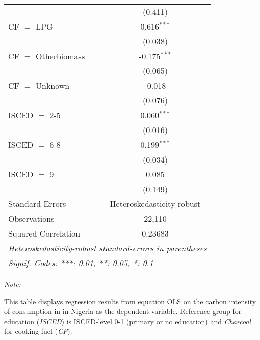\begin{table}[htbp!]
\begin{adjustbox}{width = 1\textwidth, max height = 0.95\textheight, center}
\begin{threeparttable}[b]
\begin{tabular}{lc}
                                & (0.411)\\   
            CF $=$ LPG          & 0.616$^{***}$\\   
                                & (0.038)\\   
            CF $=$ Otherbiomass & -0.175$^{***}$\\   
                                & (0.065)\\   
            CF $=$ Unknown      & -0.018\\   
                                & (0.076)\\   
            ISCED $=$ 2-5       & 0.060$^{***}$\\   
                                & (0.016)\\   
            ISCED $=$ 6-8       & 0.199$^{***}$\\   
                                & (0.034)\\   
            ISCED $=$ 9         & 0.085\\   
                                & (0.149)\\   
            \midrule 
            Standard-Errors     & Heteroskedasticity-robust \\   
            Observations        & 22,110\\  
            Squared Correlation & 0.23683\\  
            \midrule \midrule
            \multicolumn{2}{l}{\emph{Heteroskedasticity-robust standard-errors in parentheses}}\\
            \multicolumn{2}{l}{\emph{Signif. Codes: ***: 0.01, **: 0.05, *: 0.1}}\\
         \end{tabular}
         
         \begin{tablenotes}\item \medskip \textit{Note:}
            \item This table displays regression results from equation OLS on the carbon intensity of consumption in  in Nigeria as the dependent variable. Reference group for education (\textit{ISCED}) is ISCED-level 0-1 (primary or no education) and \textit{Charcoal} for cooking fuel (\textit{CF}).
         \end{tablenotes}
      \end{threeparttable}
   \end{adjustbox}
\end{table}


